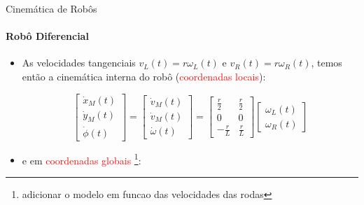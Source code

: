 \documentclass[aspectratio=169]{beamer}
\begin{document}
\begin{frame}{Cinemática de Robôs}
    \framesubtitle{Robô Diferencial}
    \begin{itemize}
        \item As velocidades tangenciais $v_L(t)=r\omega_L(t)$ e $v_R(t)=r\omega_R(t)$, temos então a cinemática interna do robô (\textcolor{red}{coordenadas locais}):

              \begin{equation*}
                  \boxed{
                      \begin{bmatrix}
                          \dot{x}_M(t) \\
                          \dot{y}_M(t) \\
                          \dot{\phi}(t)
                      \end{bmatrix}
                      =
                      \begin{bmatrix}
                          \dot{v}_M(t) \\
                          \dot{v}_M(t) \\
                          \dot{\omega}(t)
                      \end{bmatrix}
                      =
                      \begin{bmatrix}
                          \frac{r}{2}  & \frac{r}{2} \\
                          0            & 0           \\
                          -\frac{r}{L} & \frac{r}{L}
                      \end{bmatrix}
                      \begin{bmatrix}
                          \omega_L(t) \\
                          \omega_R(t)
                      \end{bmatrix}}
              \end{equation*}

        \item e em \textcolor{red}{coordenadas globais}
              \footnote{adicionar o modelo em funcao das velocidades das rodas}:


\end{itemize}
\end{frame}
\end{document}
